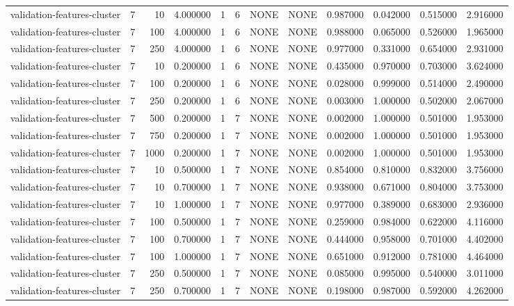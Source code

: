 \begin{tabular}{lrrrllllrrrr}
validation-features-cluster & 7 & 10 & 4.000000 & 1 & 6 & NONE & NONE & 0.987000 & 0.042000 & 0.515000 & 2.916000 \\
validation-features-cluster & 7 & 100 & 4.000000 & 1 & 6 & NONE & NONE & 0.988000 & 0.065000 & 0.526000 & 1.965000 \\
validation-features-cluster & 7 & 250 & 4.000000 & 1 & 6 & NONE & NONE & 0.977000 & 0.331000 & 0.654000 & 2.931000 \\
validation-features-cluster & 7 & 10 & 0.200000 & 1 & 6 & NONE & NONE & 0.435000 & 0.970000 & 0.703000 & 3.624000 \\
validation-features-cluster & 7 & 100 & 0.200000 & 1 & 6 & NONE & NONE & 0.028000 & 0.999000 & 0.514000 & 2.490000 \\
validation-features-cluster & 7 & 250 & 0.200000 & 1 & 6 & NONE & NONE & 0.003000 & 1.000000 & 0.502000 & 2.067000 \\
validation-features-cluster & 7 & 500 & 0.200000 & 1 & 7 & NONE & NONE & 0.002000 & 1.000000 & 0.501000 & 1.953000 \\
validation-features-cluster & 7 & 750 & 0.200000 & 1 & 7 & NONE & NONE & 0.002000 & 1.000000 & 0.501000 & 1.953000 \\
validation-features-cluster & 7 & 1000 & 0.200000 & 1 & 7 & NONE & NONE & 0.002000 & 1.000000 & 0.501000 & 1.953000 \\
validation-features-cluster & 7 & 10 & 0.500000 & 1 & 7 & NONE & NONE & 0.854000 & 0.810000 & 0.832000 & 3.756000 \\
validation-features-cluster & 7 & 10 & 0.700000 & 1 & 7 & NONE & NONE & 0.938000 & 0.671000 & 0.804000 & 3.753000 \\
validation-features-cluster & 7 & 10 & 1.000000 & 1 & 7 & NONE & NONE & 0.977000 & 0.389000 & 0.683000 & 2.936000 \\
validation-features-cluster & 7 & 100 & 0.500000 & 1 & 7 & NONE & NONE & 0.259000 & 0.984000 & 0.622000 & 4.116000 \\
validation-features-cluster & 7 & 100 & 0.700000 & 1 & 7 & NONE & NONE & 0.444000 & 0.958000 & 0.701000 & 4.402000 \\
validation-features-cluster & 7 & 100 & 1.000000 & 1 & 7 & NONE & NONE & 0.651000 & 0.912000 & 0.781000 & 4.464000 \\
validation-features-cluster & 7 & 250 & 0.500000 & 1 & 7 & NONE & NONE & 0.085000 & 0.995000 & 0.540000 & 3.011000 \\
validation-features-cluster & 7 & 250 & 0.700000 & 1 & 7 & NONE & NONE & 0.198000 & 0.987000 & 0.592000 & 4.262000 \\

\end{tabular}
